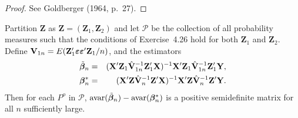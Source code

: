 \begin{proof}
See Goldberger (1964, p.~27).
\end{proof}

\begin{proposition}\label{prop:4.51}
Partition $\mathbf{Z}$ as $\mathbf{Z} = (\mathbf{Z}_1, \mathbf{Z}_2)$ and let $\mathcal{P}$ be the collection of all probability measures such that the conditions of Exercise~4.26 hold for both $\mathbf{Z}_1$ and $\mathbf{Z}_2$. Define $\mathbf{V}_{1n} = E(\mathbf{Z}_1'\boldsymbol{\varepsilon}\boldsymbol{\varepsilon}'\mathbf{Z}_1/n)$, and the estimators
\begin{eqnarray*}
\tilde{\boldsymbol{\beta}}_n &=& (\mathbf{X}'\mathbf{Z}_1\hat{\mathbf{V}}_{1n}^{-1}\mathbf{Z}_1'\mathbf{X})^{-1}\mathbf{X}'\mathbf{Z}_1\hat{\mathbf{V}}_{1n}^{-1}\mathbf{Z}_1'\mathbf{Y},\\
\boldsymbol{\beta}_n^* &=& (\mathbf{X}'\mathbf{Z}\hat{\mathbf{V}}_n^{-1}\mathbf{Z}'\mathbf{X})^{-1}\mathbf{X}'\mathbf{Z}\hat{\mathbf{V}}_n^{-1}\mathbf{Z}'\mathbf{Y}.
\end{eqnarray*}
Then for each $P^o$ in $\mathcal{P}$, $\mathrm{avar}(\tilde{\boldsymbol{\beta}}_n) - \mathrm{avar}(\boldsymbol{\beta}_n^*)$ is a positive semidefinite matrix for all $n$ sufficiently large.
\end{proposition}

